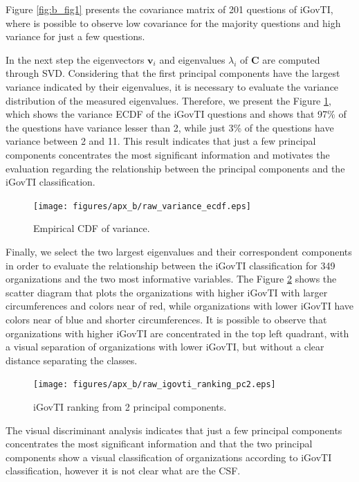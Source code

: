 Figure \ref{fig:b_fig1} presents the covariance matrix of 201 questions of iGovTI, where is possible to observe low covariance for the majority questions and high variance for just a few questions. 

In the next step the eigenvectors $\mathbf{v}_i$ and eigenvalues $\lambda_i$ of $\mathbf{C}$ are computed through SVD. Considering that the first principal components have the largest variance indicated by their eigenvalues, it is necessary to evaluate the variance distribution of the measured eigenvalues. Therefore, we present the Figure \ref{fig:b_fig2}, which shows the variance ECDF of the iGovTI questions and shows that 97\% of the questions have variance lesser than 2, while just 3\% of the questions have variance between 2 and 11. This result indicates that just a few principal components concentrates the most significant information and motivates the evaluation regarding the relationship between the principal components and the iGovTI classification.

\begin{figure}[h!]
     \centering 
     \texttt{[image: figures/apx\_b/raw\_variance\_ecdf.eps]}
     \caption{Empirical CDF of variance.}
     \label{fig:b_fig2}
\end{figure}
 
Finally, we select the two largest eigenvalues and their correspondent components in order to evaluate the relationship between the iGovTI classification for 349 organizations and the two most informative variables. The Figure \ref{fig:b_fig3} shows the scatter diagram that plots the organizations with higher iGovTI with larger circumferences and colors near of red, while organizations with lower iGovTI have colors near of blue and shorter circumferences. It is possible to observe that organizations with higher iGovTI are concentrated in the top left quadrant, with a visual separation of organizations with lower iGovTI, but without a clear distance separating the classes.
 
\begin{figure}[h!]
     \centering 
     \texttt{[image: figures/apx\_b/raw\_igovti\_ranking\_pc2.eps]}
     \caption{iGovTI ranking from 2 principal components.}
     \label{fig:b_fig3}
\end{figure}

The visual discriminant analysis indicates that just a few principal components concentrates the most significant information and that the two principal components show a visual classification of organizations according to iGovTI classification, however it is not clear what are the CSF. 

